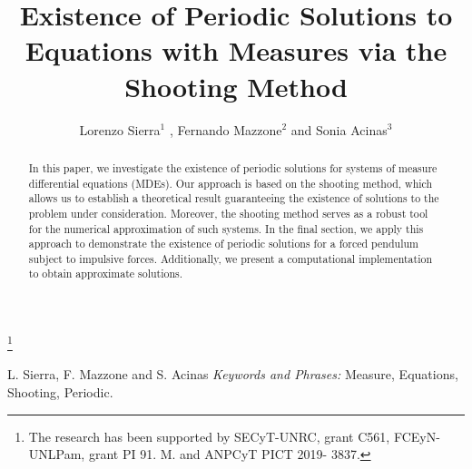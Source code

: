 \documentclass[a4paper,11pt]{amsart}
\theoremstyle{plain}
\theoremstyle{remark}
\numberwithin{equation}{section}
\begin{document}
                \title{Existence of Periodic Solutions to Equations with Measures via the  Shooting Method}

								

                \author{ Lorenzo Sierra$^1$ , Fernando Mazzone$^2$ and  Sonia Acinas$^3$ }
                        \address{$^1$ 								
Dpto. de Matem\'atica, Facultad de Ciencias Exactas y Naturales
Universidad Nacional de La Pampa
Av. Uruguay 251 (L6300CLB) Santa Rosa, La Pampa, Argentina}
			
								\address{$^2$ 								
Dpto. de Matem\'atica, Facultad de Ciencias Exactas F\'isico-Qu\'imicas y Naturales, 
Universidad Nacional de R\'io Cuarto
Ruta Nac. 36 Km. 601 (5800) R\'io Cuarto, C\'ordoba, Argentina}
       
\address{$^3$
				 Dpto. de Matem\'atica, Facultad de Ciencias Exactas y Naturales
Universidad Nacional de La Pampa
Av. Uruguay 251 (L6300CLB) Santa Rosa, La Pampa, Argentina}
				
\thanks{   The research has been supported by SECyT-UNRC, grant C561, FCEyN-UNLPam, grant PI 91. M. and ANPCyT PICT 2019- 3837.
}

\begin{abstract}
In this paper, we investigate the existence of periodic solutions for systems of measure differential equations (MDEs). Our approach is based on the shooting method, which allows us to establish a theoretical result guaranteeing the existence of solutions to the problem under consideration. Moreover, the shooting method serves as a robust tool for the numerical approximation of such systems. In the final section, we apply this approach to demonstrate the existence of periodic solutions for a forced pendulum subject to impulsive forces. Additionally, we present a computational implementation to obtain approximate solutions.
\end{abstract}


    \maketitle

        { L. Sierra, F. Mazzone and S. Acinas}
        \noindent\emph{Keywords and Phrases:}   Measure, Equations, Shooting, Periodic.
        
\end{document}
